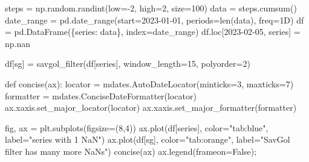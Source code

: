 \documentclass[
  letterpaper,
  DIV=11,
  numbers=noendperiod,
  oneside]{scrreprt}
\newenvironment{Shaded}{\begin{snugshade}}{\end{snugshade}}
\newcommand{\BuiltInTok}[1]{\textcolor[rgb]{0.00,0.23,0.31}{#1}}
\newcommand{\DecValTok}[1]{\textcolor[rgb]{0.68,0.00,0.00}{#1}}
\newcommand{\KeywordTok}[1]{\textcolor[rgb]{0.00,0.23,0.31}{#1}}
\newcommand{\NormalTok}[1]{\textcolor[rgb]{0.00,0.23,0.31}{#1}}
\newcommand{\OperatorTok}[1]{\textcolor[rgb]{0.37,0.37,0.37}{#1}}
\newcommand{\StringTok}[1]{\textcolor[rgb]{0.13,0.47,0.30}{#1}}
\newcommand{\VariableTok}[1]{\textcolor[rgb]{0.07,0.07,0.07}{#1}}
\begin{document}
\begin{Shaded}
\begin{Highlighting}[]
\NormalTok{steps }\OperatorTok{=}\NormalTok{ np.random.randint(low}\OperatorTok{={-}}\DecValTok{2}\NormalTok{, high}\OperatorTok{=}\DecValTok{2}\NormalTok{, size}\OperatorTok{=}\DecValTok{100}\NormalTok{)}
\NormalTok{data }\OperatorTok{=}\NormalTok{ steps.cumsum()}
\NormalTok{date\_range }\OperatorTok{=}\NormalTok{ pd.date\_range(start}\OperatorTok{=}\StringTok{\textquotesingle{}2023{-}01{-}01\textquotesingle{}}\NormalTok{, periods}\OperatorTok{=}\BuiltInTok{len}\NormalTok{(data), freq}\OperatorTok{=}\StringTok{\textquotesingle{}1D\textquotesingle{}}\NormalTok{)}
\NormalTok{df }\OperatorTok{=}\NormalTok{ pd.DataFrame(\{}\StringTok{\textquotesingle{}series\textquotesingle{}}\NormalTok{: data\}, index}\OperatorTok{=}\NormalTok{date\_range)}
\NormalTok{df.loc[}\StringTok{\textquotesingle{}2023{-}02{-}05\textquotesingle{}}\NormalTok{, }\StringTok{\textquotesingle{}series\textquotesingle{}}\NormalTok{] }\OperatorTok{=}\NormalTok{ np.nan}
\end{Highlighting}
\end{Shaded}

\begin{Shaded}
\begin{Highlighting}[]
\NormalTok{df[}\StringTok{\textquotesingle{}sg\textquotesingle{}}\NormalTok{] }\OperatorTok{=}\NormalTok{ savgol\_filter(df[}\StringTok{\textquotesingle{}series\textquotesingle{}}\NormalTok{], window\_length}\OperatorTok{=}\DecValTok{15}\NormalTok{, polyorder}\OperatorTok{=}\DecValTok{2}\NormalTok{)}

\KeywordTok{def}\NormalTok{ concise(ax):}
\NormalTok{    locator }\OperatorTok{=}\NormalTok{ mdates.AutoDateLocator(minticks}\OperatorTok{=}\DecValTok{3}\NormalTok{, maxticks}\OperatorTok{=}\DecValTok{7}\NormalTok{)}
\NormalTok{    formatter }\OperatorTok{=}\NormalTok{ mdates.ConciseDateFormatter(locator)}
\NormalTok{    ax.xaxis.set\_major\_locator(locator)}
\NormalTok{    ax.xaxis.set\_major\_formatter(formatter)}

\NormalTok{fig, ax }\OperatorTok{=}\NormalTok{ plt.subplots(figsize}\OperatorTok{=}\NormalTok{(}\DecValTok{8}\NormalTok{,}\DecValTok{4}\NormalTok{))}
\NormalTok{ax.plot(df[}\StringTok{\textquotesingle{}series\textquotesingle{}}\NormalTok{], color}\OperatorTok{=}\StringTok{"tab:blue"}\NormalTok{, label}\OperatorTok{=}\StringTok{"series with 1 NaN"}\NormalTok{)}
\NormalTok{ax.plot(df[}\StringTok{\textquotesingle{}sg\textquotesingle{}}\NormalTok{], color}\OperatorTok{=}\StringTok{"tab:orange"}\NormalTok{, label}\OperatorTok{=}\StringTok{"SavGol filter has many more NaNs"}\NormalTok{)}
\NormalTok{concise(ax)}
\NormalTok{ax.legend(frameon}\OperatorTok{=}\VariableTok{False}\NormalTok{)}\OperatorTok{;}
\end{Highlighting}
\end{Shaded}
\end{document}
